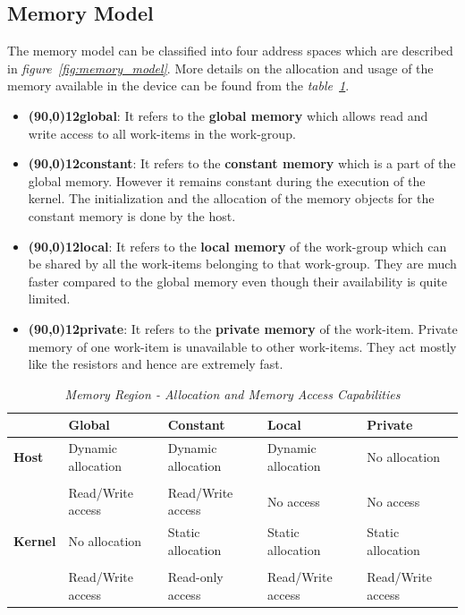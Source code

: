 \subsection{Memory Model}
The memory model can be classified into four address spaces which are described in \textit{figure~\ref{fig:memory_model}}. More details on the allocation and usage of the memory available in the device can be found from the \textit{table~\ref{tab:Memory_model}}.
\begin{itemize}
	\item \textbf{\line(90,0){12}global}: It refers to the \textbf{global memory} which allows read and write access to all work-items in the work-group.
	\item \textbf{\line(90,0){12}constant}: It refers to the \textbf{constant memory} which is a part of the global memory. However it remains constant during the execution of the kernel. The initialization and the allocation of the memory objects for the constant memory is done by the host.
	\item \textbf{\line(90,0){12}local}: It refers to the \textbf{local memory} of the work-group which can be shared by all the work-items belonging to that work-group. They are much faster compared to the global memory even though their availability is quite limited.
	\item \textbf{\line(90,0){12}private}: It refers to the \textbf{private memory} of the work-item. Private memory of one work-item is unavailable to other work-items. They act mostly like the resistors and hence are extremely fast.
\end{itemize}

\begin{table}
	\centering
		\begin{tabular}{| p{1.5cm} | p{2.5cm} | p{2.5cm} | p{2.5cm} | p{2.5cm} |}
			\hline
			 & \textbf{Global} & \textbf{Constant} & \textbf{Local} & \textbf{Private} \\ \hline
			 \textbf{Host} & Dynamic allocation & Dynamic allocation & Dynamic allocation & No allocation \\
			 & & & & \\
			 & Read/Write access & Read/Write access & No access & No access \\ \hline
			 \textbf{Kernel} & No allocation & Static allocation & Static allocation & Static allocation \\
			 & & & & \\
			 & Read/Write access & Read-only access & Read/Write access & Read/Write access \\
			\hline			
		\end{tabular}
	\caption[Memory Region]
	{\textit{Memory Region - Allocation and Memory Access Capabilities \cite[p.~28]{OpenCL_specifications}} \label{tab:Memory_model}}	
\end{table}


